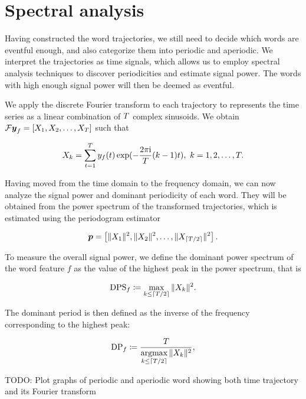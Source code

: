 \section{Spectral analysis}
Having constructed the word trajectories, we still need to decide which words are eventful enough, and also categorize them into periodic and aperiodic. We interpret the trajectories as time signals, which allows us to employ spectral analysis techniques to discover periodicities and estimate signal power. The words with high enough signal power will then be deemed as eventful.

We apply the discrete Fourier transform to each trajectory to represents the time series as a linear combination of $T$ complex sinusoids. We obtain $\mathcal{F} \vect{\traj}_{f} = \left[ X_{1}, X_{2}, \dots, X_{\streamlen}\right ]$ such that

\begin{equation*}
	X_{k} = \sum_{t = 1}^{T}{y_{f}(t) \exp(- \frac{2 \pi \mathrm{i}}{T} (k - 1) t}), ~ k = 1, 2, \dots, T.
\end{equation*}

Having moved from the time domain to the frequency domain, we can now analyze the signal power and dominant periodicity of each word. They will be obtained from the power spectrum of the transformed trajectories, which is estimated using the periodogram estimator

\begin{equation*}
	\vect{P} = \left[ \|X_{1}\|^{2}, \|X_{2}\|^{2}, \dots, \|X_{\ceil{\streamlen / 2}}\|^{2} \right].
\end{equation*}

To measure the overall signal power, we define the dominant power spectrum of the word feature $f$ as the value of the highest peak in the power spectrum, that is

\begin{equation}
	\text{DPS}_{f} \coloneqq \max\limits_{k \leq \lceil T / 2\rceil}{\|X_{k}\|^{2}}.
\end{equation}

The dominant period is then defined as the inverse of the frequency corresponding to the highest peak:

\begin{equation}
	\text{DP}_{f} \coloneqq \frac{T}{\operatorname*{argmax}\limits_{k \leq \lceil T / 2\rceil}{\|X_{k}\|^{2}}},
\end{equation}

{\color{red} TODO: Plot graphs of periodic and aperiodic word showing both time trajectory and its Fourier transform}

